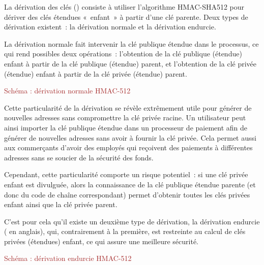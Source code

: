 
La dérivation des clés () consiste à utiliser l'algorithme HMAC-SHA512 pour dériver des clés étendues «~enfant~» à partir d'une clé parente. Deux types de dérivation existent~: la dérivation normale et la dérivation endurcie.

La dérivation normale fait intervenir la clé publique étendue dans le processus, ce qui rend possibles deux opérations~: l'obtention de la clé publique (étendue) enfant à partir de la clé publique (étendue) parent, et l'obtention de la clé privée (étendue) enfant à partir de la clé privée (étendue) parent. 

\textcolor{brown}{Schéma : dérivation normale HMAC-512}

Cette particularité de la dérivation se révèle extrêmement utile pour générer de nouvelles adresses sans compromettre la clé privée racine. Un utilisateur peut ainsi importer la clé publique étendue dans un processeur de paiement afin de générer de nouvelles adresses sans avoir à fournir la clé privée. Cela permet aussi aux commerçants d'avoir des employés qui reçoivent des paiements à différentes adresses sans se soucier de la sécurité des fonds.

Cependant, cette particularité comporte un risque potentiel~: si une clé privée enfant est divulguée, alors la connaissance de la clé publique étendue parente (et donc du code de chaîne correspondant) permet d'obtenir toutes les clés privées enfant ainsi que la clé privée parent.


C'est pour cela qu'il existe un deuxième type de dérivation, la dérivation endurcie ( en anglais), qui, contrairement à la première, est restreinte au calcul de clés privées (étendues) enfant, ce qui assure une meilleure sécurité.

\textcolor{brown}{Schéma : dérivation endurcie HMAC-512}

